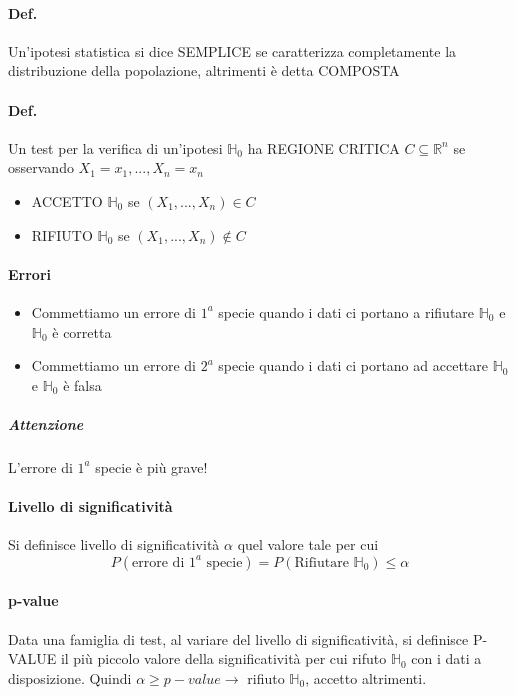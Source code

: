 \documentclass{article}
\begin{document}
	\paragraph{Def.} Un'ipotesi statistica si dice SEMPLICE se caratterizza completamente la distribuzione della popolazione, altrimenti è detta COMPOSTA
	\paragraph{Def.} Un test per la verifica di un'ipotesi $\mathbb{H}_0$ ha REGIONE CRITICA $C \subseteq \mathbb{R}^n$ se osservando $X_1=x_1,...,X_n=x_n$
	\begin{itemize}
		\item ACCETTO $\mathbb{H}_0$ se $(X_1,...,X_n)\in C$
		\item RIFIUTO $\mathbb{H}_0$ se $(X_1,...,X_n)\notin C$
	\end{itemize}
	\paragraph{Errori}
	\begin{itemize}
		\item Commettiamo un errore di $1^a$ specie quando i dati ci portano a rifiutare $\mathbb{H}_0$ e $\mathbb{H}_0$ è corretta
		\item Commettiamo un errore di $2^a$ specie quando i dati ci portano ad accettare $\mathbb{H}_0$ e $\mathbb{H}_0$ è falsa
	\end{itemize}
	\subparagraph{Attenzione}
	L'errore di $1^a$ specie è più grave!
	\paragraph{Livello di significatività}
	Si definisce livello di significatività $\alpha$ quel valore tale per cui
	\begin{equation*}
		P(\text{errore di }1^a\text{ specie}) = P(\text{Rifiutare } \mathbb{H}_0)\leq \alpha
	\end{equation*}
	\paragraph{p-value}
	Data una famiglia di test, al variare del livello di significatività, si definisce P-VALUE il più piccolo valore della significatività per cui rifuto $\mathbb{H}_0$ con i dati a disposizione. Quindi $\alpha \geq p-value \rightarrow $ rifiuto $\mathbb{H}_0$, accetto altrimenti.
\end{document}
